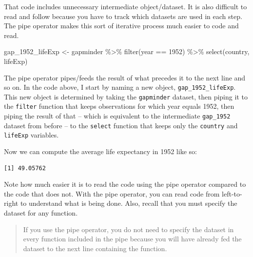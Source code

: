 \documentclass[
]{book}
\makeatletter
\newenvironment{Shaded}{\begin{snugshade}}{\end{snugshade}}
\newcommand{\DecValTok}[1]{\textcolor[rgb]{0.06,0.06,0.06}{#1}}
\newcommand{\FunctionTok}[1]{\textcolor[rgb]{0,0,0}{#1}}
\newcommand{\NormalTok}[1]{#1}
\newcommand{\OtherTok}[1]{\textcolor[rgb]{0.37,0.37,0.37}{#1}}
\newcommand{\SpecialCharTok}[1]{\textcolor[rgb]{0,0,0}{#1}}
\newenvironment{kframe}{%
\medskip{}
\setlength{\fboxsep}{.8em}
 \def\at@end@of@kframe{}%
 \ifinner\ifhmode%
  \def\at@end@of@kframe{\end{minipage}}%
  \begin{minipage}{\columnwidth}%
 \fi\fi%
 \def\FrameCommand##1{\hskip\@totalleftmargin \hskip-\fboxsep
 \colorbox{shadecolor}{##1}\hskip-\fboxsep
     \hskip-\linewidth \hskip-\@totalleftmargin \hskip\columnwidth}%
 \MakeFramed {\advance\hsize-\width
   \@totalleftmargin\z@ \linewidth\hsize
   \@setminipage}}%
 {\par\unskip\endMakeFramed%
 \at@end@of@kframe}
\renewenvironment{Shaded}{\begin{kframe}}{\end{kframe}}
\makeatother
\begin{document}
That code includes unnecessary intermediate object/dataset. It is also difficult to read and follow because you have to track which datasets are used in each step. The pipe operator makes this sort of iterative process much easier to code and read.

\begin{Shaded}
\begin{Highlighting}[]
\NormalTok{gap\_1952\_lifeExp }\OtherTok{\textless{}{-}}\NormalTok{ gapminder }\SpecialCharTok{\%\textgreater{}\%} 
  \FunctionTok{filter}\NormalTok{(year }\SpecialCharTok{==} \DecValTok{1952}\NormalTok{) }\SpecialCharTok{\%\textgreater{}\%} 
  \FunctionTok{select}\NormalTok{(country, lifeExp)}
\end{Highlighting}
\end{Shaded}

The pipe operator pipes/feeds the result of what precedes it to the next line and so on. In the code above, I start by naming a new object, \texttt{gap\_1952\_lifeExp}. This new object is determined by taking the \texttt{gapminder} dataset, then piping it to the \texttt{filter} function that keeps observations for which year equals 1952, then piping the result of that -- which is equivalent to the intermediate \texttt{gap\_1952} dataset from before -- to the \texttt{select} function that keeps only the \texttt{country} and \texttt{lifeExp} variables.

Now we can compute the average life expectancy in 1952 like so:

\begin{Shaded}
\end{Shaded}

\begin{verbatim}
[1] 49.05762
\end{verbatim}

Note how much easier it is to read the code using the pipe operator compared to the code that does not. With the pipe operator, you can read code from left-to-right to understand what is being done. Also, recall that you must specify the dataset for any function.

\begin{quote}
If you use the pipe operator, you do not need to specify the dataset in every function included in the pipe because you will have already fed the dataset to the next line containing the function.
\end{quote}
\end{document}
